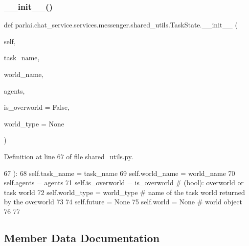 \subsubsection{\texorpdfstring{\+\_\+\+\_\+init\+\_\+\+\_\+()}{\_\_init\_\_()}}
{\footnotesize\ttfamily def parlai.\+chat\+\_\+service.\+services.\+messenger.\+shared\+\_\+utils.\+Task\+State.\+\_\+\+\_\+init\+\_\+\+\_\+ (\begin{DoxyParamCaption}\item[{}]{self,  }\item[{}]{task\+\_\+name,  }\item[{}]{world\+\_\+name,  }\item[{}]{agents,  }\item[{}]{is\+\_\+overworld = {\ttfamily False},  }\item[{}]{world\+\_\+type = {\ttfamily None} }\end{DoxyParamCaption})}



Definition at line 67 of file shared\+\_\+utils.\+py.


\begin{DoxyCode}
67     ):
68         self.task\_name = task\_name
69         self.world\_name = world\_name
70         self.agents = agents
71         self.is\_overworld = is\_overworld  \textcolor{comment}{# (bool): overworld or task world}
72         self.world\_type = world\_type  \textcolor{comment}{# name of the task world returned by the overworld}
73 
74         self.future = \textcolor{keywordtype}{None}
75         self.world = \textcolor{keywordtype}{None}  \textcolor{comment}{# world object}
76 
77 
\end{DoxyCode}


\subsection{Member Data Documentation}
\mbox{\label{classparlai_1_1chat__service_1_1services_1_1messenger_1_1shared__utils_1_1TaskState_a2e39f33ab663bb7345223e90f0dd530d}} 
